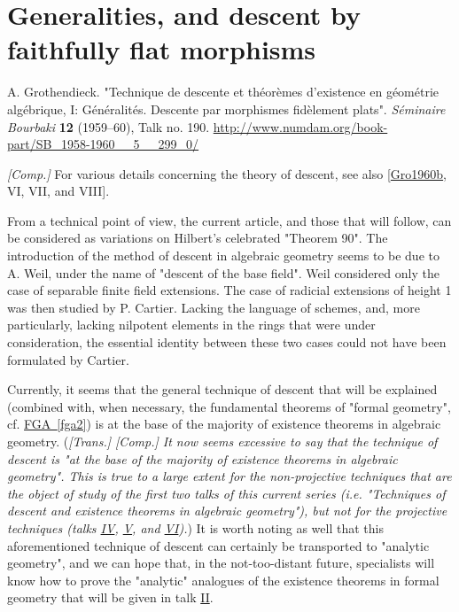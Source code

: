 \part{Generalities, and descent by faithfully flat morphisms}\label{fga3.i}\thispagestyle{fancy}\begin{original}{}\label{fga3.i-original-citation}\skipsinglepar\par{}A. Grothendieck.
    "Technique de descente et théorèmes d'existence en géométrie algébrique, I: Généralités. Descente par morphismes fidèlement plats".
    \emph{Séminaire Bourbaki} \textbf{12} (1959–60), Talk no. 190.
    \url{http://www.numdam.org/book-part/SB_1958-1960__5__299_0/}\end{original}\par{}\emph{[Comp.]}
  For various details concerning the theory of descent, see also [\hyperref[Gro1960b]{Gro1960b}, VI, VII, and VIII].\par{}From a technical point of view, the current article, and those that will follow, can be considered as variations on Hilbert's celebrated "Theorem 90".
  The introduction of the method of descent in algebraic geometry seems to be due to A. Weil, under the name of "descent of the base field".
  Weil considered only the case of separable finite field extensions.
  The case of radicial extensions of height 1 was then studied by P. Cartier.
  Lacking the language of schemes, and, more particularly, lacking nilpotent elements in the rings that were under consideration, the essential identity between these two cases could not have been formulated by Cartier.\par{}Currently, it seems that the general technique of descent that will be explained (combined with, when necessary, the fundamental theorems of "formal geometry", cf. \hyperref[fga2]{FGA~\ref*{fga2}}) is at the base of the majority of existence theorems in algebraic geometry.
   (\emph{[Trans.] \emph{[Comp.]} It now seems excessive to say that the technique of descent is "at the base of the majority of existence theorems in algebraic geometry". This is true to a large extent for the non-projective techniques that are the object of study of the first two talks of this current series (i.e. "Techniques of descent and existence theorems in algebraic geometry"), but not for the projective techniques (talks \hyperref[fga3.iv]{IV}, \hyperref[fga3.v]{V}, and \hyperref[fga3.vi]{VI}).})
  It is worth noting as well that this aforementioned technique of descent can certainly be transported to "analytic geometry", and we can hope that, in the not-too-distant future, specialists will know how to prove the "analytic" analogues of the existence theorems in formal geometry that will be given in talk \hyperref[fga3.ii]{II}.
